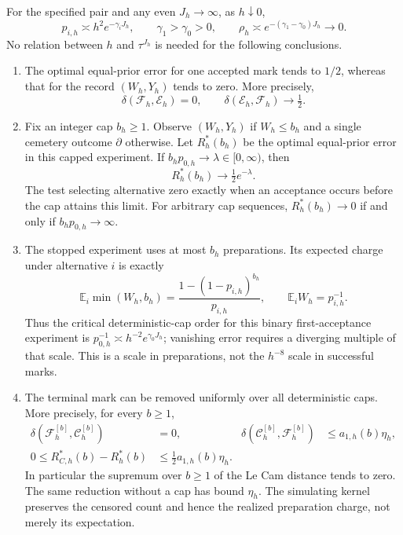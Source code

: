 \begin{theorem}
\label{thm:v54-waiting-and-cap}
For the specified pair and any even $J_h\to\infty$, as $h\downarrow0$,
\begin{equation}\label{eq:v54-escape-separation}
 p_{i,h}\asymp h^2e^{-\gamma_iJ_h},\qquad
 \gamma_1>\gamma_0>0,\qquad
 \rho_h\asymp e^{-(\gamma_1-\gamma_0)J_h}\longrightarrow0.
\end{equation}
No relation between $h$ and $\tau^{J_h}$ is needed for the following
conclusions.
\begin{enumerate}
\item The optimal equal-prior error for one accepted mark tends to
$1/2$, whereas that for the record $(W_h,Y_h)$ tends to zero.  More
precisely,
\begin{equation}\label{eq:v54-deficiency}
 \delta(\mathcal F_h,\mathcal E_h)=0,\qquad
 \delta(\mathcal E_h,\mathcal F_h)\longrightarrow\tfrac12.
\end{equation}
\item Fix an integer cap $b_h\ge1$.  Observe $(W_h,Y_h)$ if $W_h\le b_h$
and a single cemetery outcome $\partial$ otherwise.  Let $R_h^*(b_h)$
be the optimal equal-prior error in this capped experiment.  If
$b_hp_{0,h}\to\lambda\in[0,\infty)$, then
\begin{equation}\label{eq:v54-capped-critical-risk}
                       R_h^*(b_h)\longrightarrow\tfrac12e^{-\lambda}.
\end{equation}
The test selecting alternative zero exactly when an acceptance occurs
before the cap attains this limit.  For arbitrary cap sequences,
$R_h^*(b_h)\to0$ if and only if $b_hp_{0,h}\to\infty$.
\item The stopped experiment uses at most $b_h$ preparations.  Its
expected charge under alternative $i$ is exactly
\begin{equation}\label{eq:v54-capped-charge}
 \mathbb E_i\min(W_h,b_h)=\frac{1-(1-p_{i,h})^{b_h}}{p_{i,h}},
                \qquad \mathbb E_iW_h=p_{i,h}^{-1}.
\end{equation}
Thus the critical deterministic-cap order for this binary
first-acceptance experiment is
$p_{0,h}^{-1}\asymp h^{-2}e^{\gamma_0J_h}$; vanishing error requires
a diverging multiple of that scale.  This is a scale in preparations,
not the $h^{-8}$ scale in successful marks.

\item The terminal mark can be removed uniformly over all deterministic
caps.  More precisely, for every $b\ge1$,
\begin{align}
 \delta(\mathcal F_h^{[b]},\mathcal C_h^{[b]})&=0,&
 \delta(\mathcal C_h^{[b]},\mathcal F_h^{[b]})
     &\le a_{1,h}(b)\eta_h, \label{eq:v55-count-simulation}\\
 0\le R_{C,h}^*(b)-R_h^*(b)&\le\tfrac12a_{1,h}(b)\eta_h.
                                      \label{eq:v55-count-risk-bound}
\end{align}
In particular the supremum over $b\ge1$ of the Le Cam distance tends
to zero.  The same reduction without a cap has bound $\eta_h$.
The simulating kernel preserves the censored count and hence the
realized preparation charge, not merely its expectation.


\end{enumerate}
\end{theorem}

